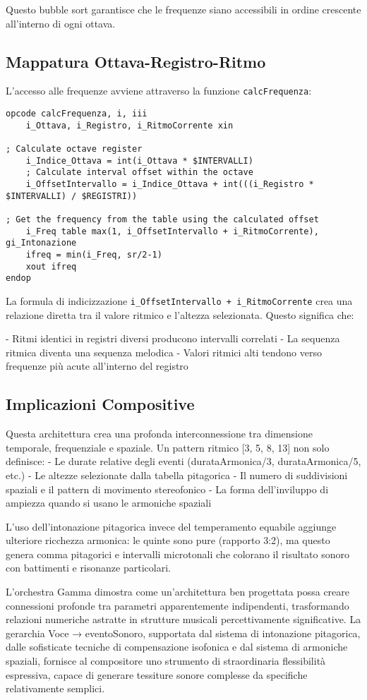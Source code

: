 Questo bubble sort garantisce che le frequenze siano accessibili in ordine crescente all'interno di ogni ottava.
\subsection{Mappatura Ottava-Registro-Ritmo}
L'accesso alle frequenze avviene attraverso la funzione \texttt{calcFrequenza}:

\begin{lstlisting}[language=Csound]
opcode calcFrequenza, i, iii
    i_Ottava, i_Registro, i_RitmoCorrente xin

; Calculate octave register
    i_Indice_Ottava = int(i_Ottava * $INTERVALLI)
    ; Calculate interval offset within the octave
    i_OffsetIntervallo = i_Indice_Ottava + int(((i_Registro * $INTERVALLI) / $REGISTRI))

; Get the frequency from the table using the calculated offset
    i_Freq table max(1, i_OffsetIntervallo + i_RitmoCorrente), gi_Intonazione
    ifreq = min(i_Freq, sr/2-1)
    xout ifreq
endop
\end{lstlisting}

La formula di indicizzazione \texttt{i\_OffsetIntervallo + i\_RitmoCorrente} crea una relazione diretta tra il valore ritmico e l'altezza selezionata. Questo significa che:

- Ritmi identici in registri diversi producono intervalli correlati
- La sequenza ritmica diventa una sequenza melodica
- Valori ritmici alti tendono verso frequenze più acute all'interno del registro
\subsection{Implicazioni Compositive}
Questa architettura crea una profonda interconnessione tra dimensione temporale, frequenziale e spaziale. Un pattern ritmico [3, 5, 8, 13] non solo definisce:
- Le durate relative degli eventi (durataArmonica/3, durataArmonica/5, etc.)
- Le altezze selezionate dalla tabella pitagorica
- Il numero di suddivisioni spaziali e il pattern di movimento stereofonico
- La forma dell'inviluppo di ampiezza quando si usano le armoniche spaziali

L'uso dell'intonazione pitagorica invece del temperamento equabile aggiunge ulteriore ricchezza armonica: le quinte sono pure (rapporto 3:2), ma questo genera comma pitagorici e intervalli microtonali che colorano il risultato sonoro con battimenti e risonanze particolari.

L'orchestra Gamma dimostra come un'architettura ben progettata possa creare connessioni profonde tra parametri apparentemente indipendenti, trasformando relazioni numeriche astratte in strutture musicali percettivamente significative. La gerarchia Voce → eventoSonoro, supportata dal sistema di intonazione pitagorica, dalle sofisticate tecniche di compensazione isofonica e dal sistema di armoniche spaziali, fornisce al compositore uno strumento di straordinaria flessibilità espressiva, capace di generare tessiture sonore complesse da specifiche relativamente semplici.

